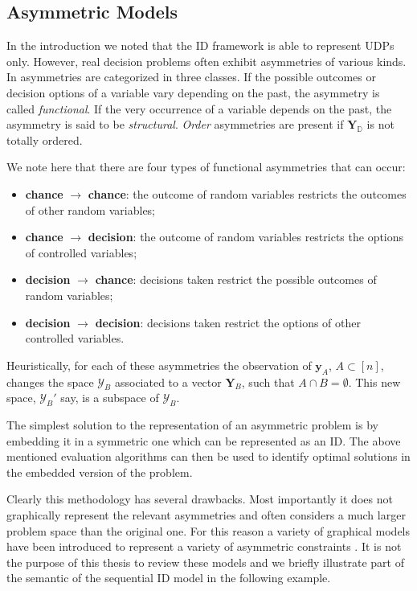 \subsection{Asymmetric Models}
 \label{sec:asy}
In the introduction we noted that the \gls{ID} framework is able to represent \glspl{UDP} only. However, real decision problems often exhibit asymmetries of various kinds. In \citep{Jensen2009} asymmetries are categorized in three classes. If the possible outcomes or decision options of a variable vary depending on the past, the asymmetry is called \textit{functional}. If the very occurrence of a variable depends on the past, the asymmetry is said to be \textit{structural}. \textit{Order} asymmetries are present if $\bm{Y}_{\mathbb{D}}$ is not totally ordered.

We note here that there are four types of functional asymmetries that can occur:
\begin{itemize}
\item \textbf{chance} $\rightarrow$ \textbf{chance}: the outcome of random variables restricts the outcomes of other random variables;
\item \textbf{chance} $\rightarrow$ \textbf{decision}: the outcome of random variables restricts the options of controlled variables;
\item \textbf{decision} $\rightarrow$ \textbf{chance}: decisions taken restrict the possible outcomes of random variables;
\item \textbf{decision} $\rightarrow$ \textbf{decision}:  decisions taken restrict the options of other controlled variables.
\end{itemize}
Heuristically, for each of these asymmetries the observation of $\bm{y}_A$, $A\subset [n]$, changes the space $\bm{\mathcal{Y}}_B$ associated to a vector $\bm{Y}_B$, such that $A\cap B=\emptyset$. This new space, $\bm{\mathcal{Y}}_B'$ say, is a subspace of $\bm{\mathcal{Y}}_B$.

The simplest solution to the representation of an asymmetric problem is by embedding it in a symmetric one which can be represented as an \gls{ID}. The above mentioned evaluation algorithms can then be used to identify optimal solutions in the embedded version of the problem. 

Clearly this methodology has several drawbacks. Most importantly it does not graphically represent the relevant asymmetries and often considers a much larger problem space than the original one. For this reason a variety of graphical models have been introduced to represent a variety of asymmetric constraints \citep{Smith1993,  Demirer2006a, Nielsen2003, Jensen2006, Jensen2002, Bhattacharjya2012}. It is not the purpose of this thesis to review these models and we briefly illustrate part of the semantic of the sequential \gls{ID} \citep{Jensen2006} model in the following example. 


